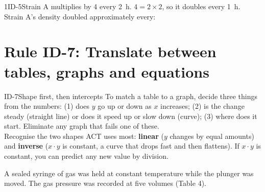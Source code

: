 \documentclass[11pt]{article}
\begin{document}
\begin{q}{1}{ID-5}{Strain A multiplies by 4 every \SI{2}{\hour}. $4=2\times2$, so it doubles every \SI{1}{\hour}.}
Strain A's density doubled approximately every:
\end{q}

\section{Rule ID-7: Translate between tables, graphs and equations}

\begin{rulebox}{ID-7}{Shape first, then intercepts}
To match a table to a graph, decide three things from the numbers: (1) does $y$ go up or down as $x$ increases; (2) is the change steady (straight line) or does it speed up or slow down (curve); (3) where does it start. Eliminate any graph that fails one of these.\\
Recognise the two shapes ACT uses most: \textbf{linear} ($y$ changes by equal amounts) and \textbf{inverse} ($x\cdot y$ is constant, a curve that drops fast and then flattens). If $x\cdot y$ is constant, you can predict any new value by division.
\end{rulebox}

A sealed syringe of gas was held at constant temperature while the plunger was moved. The gas pressure was recorded at five volumes (Table 4).

\passageend
\end{document}
